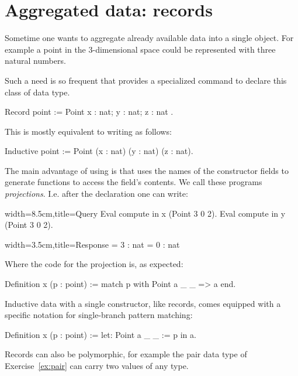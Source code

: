 \section{Aggregated data: records}
\label{sec:records}

Sometime one wants to aggregate already available data into a single object.
For example a point in the 3-dimensional space could be represented with
three natural numbers.

Such a need is so frequent that \Coq{} provides a specialized command
to declare this class of data type.

\begin{coq}{}{}
Record point := Point { x : nat; y : nat; z : nat }.
\end{coq}
This is mostly equivalent to writing as follows:

\begin{coq}{}{}
Inductive point := Point (x : nat) (y : nat) (z : nat).
\end{coq}

The main advantage of using  is that \Coq{} uses the names of the
constructor fields to generate functions to access the field's contents.  We
call these programs \emph{projections}.  I.e. after the  declaration
one can write:

\begin{coq}{}{width=8.5cm,title=Query}
Eval compute in x (Point 3 0 2).
Eval compute in y (Point 3 0 2).
\end{coq}{}{}
\begin{coqout}{}{width=3.5cm,title=Response}
= 3 : nat
= 0 : nat
\end{coqout}{}{}
Where the code for the  projection is, as expected:

\begin{coq}{}{}
Definition x (p : point) := match p with Point a _ _ => a end.
\end{coq}
Inductive data with a single constructor, like records, comes
equipped with a specific notation for single-branch pattern
matching:

\begin{coq}{}{}
Definition x (p : point) := let: Point a _ _ := p in a.
\end{coq}

Records can also be polymorphic, for example the pair data type of
Exercise~\ref{ex:pair} can carry two values of any type.


